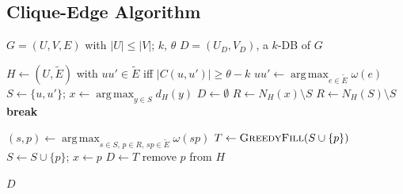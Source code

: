 \documentclass[conference]{IEEEtran}
\begin{document}
\subsection{Clique-Edge Algorithm}

\begin{algorithm}[H]
\caption{Clique-Edge}
\label{alg:clique-edge}
\begin{algorithmic}[1]
   \Require $G = (U, V, E)$ with $|U| \le |V|$; $k$, $\theta$
   \Ensure $D = (U_D, V_D)$, a $k$-DB of $G$

   \State $H \gets (U, \tilde{E})$ with $uu' \in \tilde{E}$ iff $|C(u,u')| \ge \theta - k$
   \State $uu' \gets \operatorname*{arg\,max}_{e \in \tilde{E}} \omega(e)$
   \State $S \gets \{u, u'\}$; \quad $x \gets \operatorname*{arg\,max}_{y \in S} d_H(y)$
   \State $D \gets \emptyset$
       \State $R \gets N_H(x) \setminus S$
           \State $R \gets N_H(S) \setminus S$
       \EndIf
        \textbf{break} \EndIf

       \State $(s, p) \gets \operatorname*{arg\,max}_{s \in S,\, p \in R,\, sp \in \tilde{E}} \omega(sp)$
       \State $T \gets \textsc{GreedyFill}(S \cup \{p\})$
           \State $S \gets S \cup \{p\}$; \quad $x \gets p$
               \State$D \gets T$
           \EndIf
       \Else
           \State remove $p$ from $H$
       \EndIf
   \EndWhile

   \State \Return $D$
\end{algorithmic}
\end{algorithm}
\end{document}
